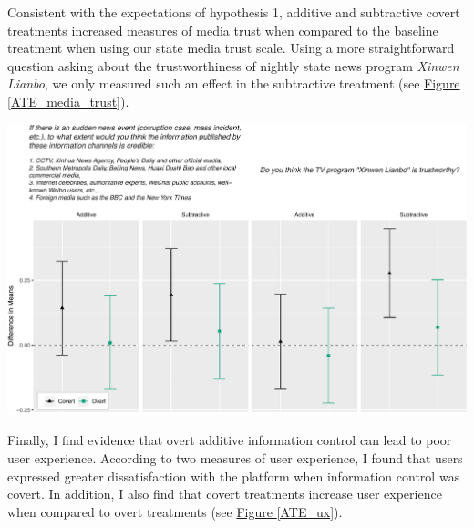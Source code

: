 \documentclass[11pt]{article}
\begin{document}
Consistent with the expectations of hypothesis 1, additive and subtractive covert treatments increased measures of media trust when compared to the baseline treatment when using our state media trust scale. Using a more straightforward question asking about the trustworthiness of nightly state news program {\it Xinwen Lianbo}, we only measured such an effect in the subtractive treatment (see \hyperref[ATE_media_trust]{Figure \ref*{ATE_media_trust}}).

\begin{minipage}{\linewidth}
    \vspace{1em}
    \begin{center}
        \includegraphics[width=.9\textwidth]{figures/raw_media_trust.pdf}\\
        \label{ATE_media_trust}
    \end{center}
    \vspace{1em}
\end{minipage}

Finally, I find evidence that overt additive information control can lead to poor user experience. According to two measures of user experience, I found that users expressed greater dissatisfaction with the platform when information control was covert. In addition, I also find that covert treatments increase user experience when compared to overt treatments (see \hyperref[ATE_ux]{Figure \ref*{ATE_ux}}).
\end{document}
